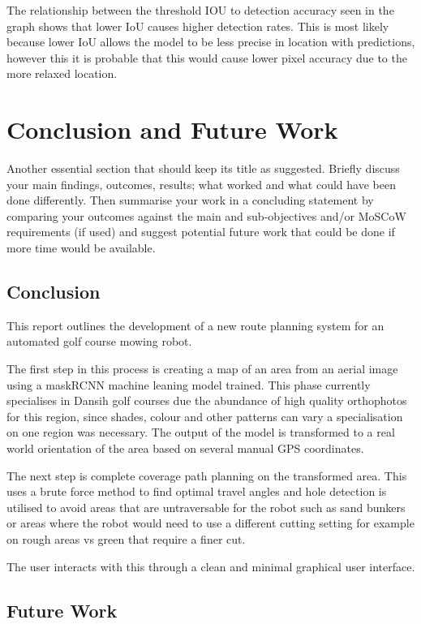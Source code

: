 \documentclass[final]{cmpreport_02}
\begin{document}
The relationship between the threshold  IOU to detection accuracy seen in the graph shows that lower IoU causes higher detection rates.
This is most likely because lower IoU allows the model to be less precise in location with predictions, however this it is probable that this would cause lower pixel accuracy due to the more relaxed location. 


\section{Conclusion and Future Work}


Another essential section that should keep its title as suggested. Briefly discuss your main findings, outcomes, results; what worked and what could have been done differently. Then summarise your work in a concluding statement by comparing your outcomes against the main and sub-objectives and/or MoSCoW requirements (if used) and suggest potential future work that could be done if more time would be available.

\subsection{Conclusion}
This report outlines the development of a new route planning system for an automated golf course mowing robot. 

The first step in this process is creating a map of an area from an aerial image using a maskRCNN machine leaning model trained.
This phase currently specialises in Dansih golf courses due the abundance of high quality orthophotos for this region, since shades, colour and other patterns can vary a specialisation on one region was necessary.
The output of the model is transformed to a real world orientation of the area based on several manual GPS coordinates.

The next step is complete coverage path planning on the transformed area.
This uses a brute force method to find optimal travel angles and hole detection is utilised to avoid areas that are untraversable for the robot such as sand bunkers or areas where the robot would need to use a different cutting setting for example on rough areas vs green that require a finer cut.

The user interacts with this through a clean and minimal graphical user interface.


\subsection{Future Work}
\end{document}
